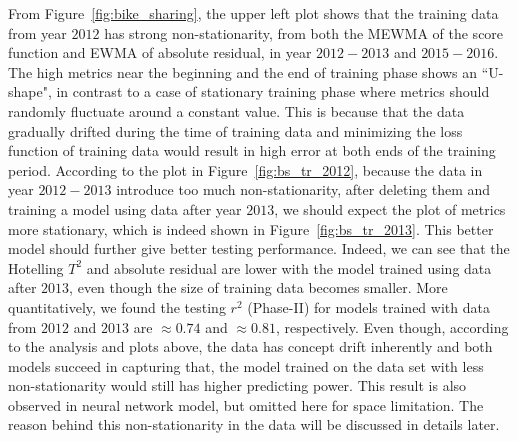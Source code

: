 \documentclass[twoside,11pt]{article}
\begin{document}
From Figure~\ref{fig:bike_sharing}, the upper left plot shows that the training data from year $2012$ has strong non-stationarity, from both the MEWMA of the score function and EWMA of absolute residual, in year $2012-2013$ and $2015-2016$. The high metrics near the beginning and the end of training phase shows an ``U-shape", in contrast to a case of stationary training phase where metrics should randomly fluctuate around a constant value. This is because that the data gradually drifted during the time of training data and minimizing the loss function of training data would result in high error at both ends of the training period. According to the plot in Figure~\ref{fig:bs_tr_2012}, because the data in year $2012-2013$ introduce too much non-stationarity, after deleting them and training a model using data after year $2013$, we should expect the plot of metrics more stationary, which is indeed shown in Figure~\ref{fig:bs_tr_2013}. This better model should further give better testing performance. Indeed, we can see that the Hotelling $T^2$ and absolute residual are lower with the model trained using data after $2013$, even though the size of training data becomes smaller. More quantitatively, we found the testing $r^2$ (Phase-II) for models trained with data from $2012$ and $2013$ are $\approx0.74$ and $\approx0.81$, respectively. Even though, according to the analysis and plots above, the data has concept drift inherently and both models succeed in capturing that, the model trained on the data set with less non-stationarity would still has higher predicting power. This result is also observed in neural network model, but omitted here for space limitation. The reason behind this non-stationarity in the data will be discussed in details later.
\end{document}

